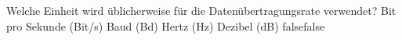     {Welche Einheit wird üblicherweise für die Datenübertragungsrate verwendet?}
    {Bit pro Sekunde (Bit/s)}
    {Baud (Bd)}
    {Hertz (Hz)}
    {Dezibel (dB)}
    {false}{false}